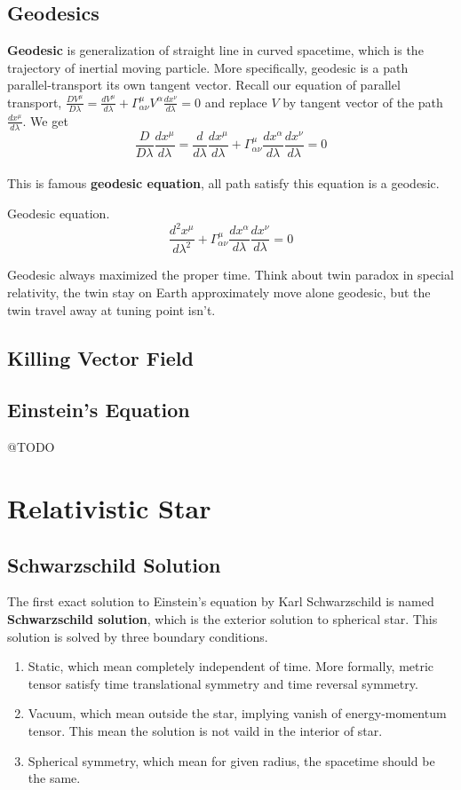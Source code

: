 \documentclass[12pt]{article}
\theoremstyle{mystyle}{\newtheorem{definition}{Definition}[section]}
\theoremstyle{mystyle}{\newtheorem{theorem}[definition]{Theorem}}
\theoremstyle{mystyle}{\newtheorem*{remark}{Remark}}
\theoremstyle{mystyle}{\newtheorem*{example}{Example}}
\theoremstyle{mystyle}{\newtheorem*{examples}{Examples}}
\theoremstyle{cstyle}{\newtheorem*{cthm}{}}
\begin{document}
\subsection{Geodesics}

\textbf{Geodesic} is generalization of straight line in curved spacetime, which is the trajectory of inertial moving particle. 
More specifically, geodesic is a path parallel-transport its own tangent vector. 
Recall our equation of parallel transport, \(\frac{DV^{\mu}}{D\lambda} =
\frac{dV^{\mu}}{d\lambda}+ \Gamma^{\mu}_{\alpha\nu}V^{\alpha}\frac{dx^{\nu}}{d\lambda} = 0\) and replace \(V\) 
by tangent vector of the path \(\frac{dx^{\mu}}{d\lambda}\). We get 
\[\frac{D}{D\lambda}\frac{dx^{\mu}}{d\lambda} =
\frac{d}{d\lambda}\frac{dx^{\mu}}{d\lambda}+ \Gamma^{\mu}_{\alpha\nu}\frac{dx^{\alpha}}{d\lambda}\frac{dx^{\nu}}{d\lambda} = 0\]\\
This is famous \textbf{geodesic equation}, all path satisfy this equation is a geodesic.
\begin{definition}
  Geodesic equation.
  \[\frac{d^2 x^{\mu}}{d\lambda^2}+ \Gamma^{\mu}_{\alpha\nu}\frac{dx^{\alpha}}{d\lambda}\frac{dx^{\nu}}{d\lambda} = 0\]
\end{definition}
Geodesic always maximized the proper time. Think about twin paradox in special relativity, the twin stay on Earth approximately move alone geodesic, 
but the twin travel away at tuning point isn't.

\subsection{Killing Vector Field}

\subsection{Einstein's Equation}
@TODO
\section{Relativistic Star}
\subsection{Schwarzschild Solution}
The first exact solution to Einstein's equation by Karl Schwarzschild is named \textbf{Schwarzschild solution}, 
which is the exterior solution to spherical star.
This solution is solved by three boundary conditions.
\begin{enumerate}
  \item Static, which mean completely independent of time. More formally, metric tensor satisfy time translational symmetry and time reversal symmetry.
  \item Vacuum, which mean outside the star, implying vanish of energy-momentum tensor. This mean the solution is not vaild in the interior of star.
  \item Spherical symmetry, which mean for given radius, the spacetime should be the same.
\end{enumerate}
\end{document}
